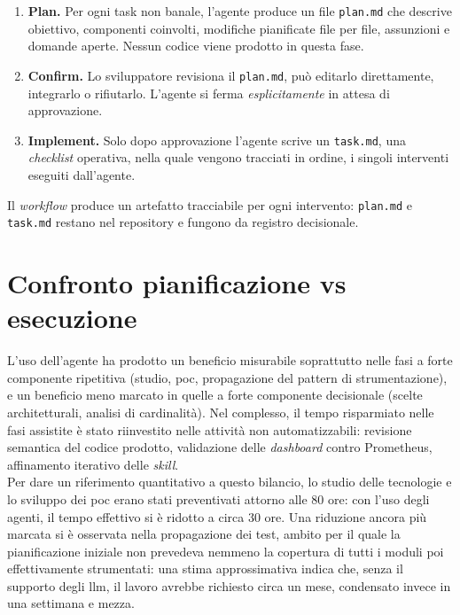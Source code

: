 \begin{enumerate}
      \item \textbf{Plan.} Per ogni task non banale, l'agente produce un file
            \texttt{plan.md} che descrive
            obiettivo, componenti coinvolti, modifiche pianificate file per file, assunzioni e
            domande aperte. Nessun codice viene prodotto in questa fase.
      \item \textbf{Confirm.} Lo sviluppatore revisiona il \texttt{plan.md}, può editarlo
            direttamente, integrarlo o rifiutarlo. L'agente si ferma \emph{esplicitamente} in
            attesa di approvazione.
      \item \textbf{Implement.} Solo dopo approvazione l'agente scrive un \texttt{task.md}, una
            \emph{checklist} operativa, nella quale vengono tracciati in ordine, i singoli interventi
            eseguiti dall'agente.
\end{enumerate}
Il \emph{workflow} produce un artefatto tracciabile per ogni intervento: \texttt{plan.md} e
\texttt{task.md} restano nel repository e fungono da registro decisionale.

\section{Confronto pianificazione vs esecuzione}

L'uso dell'agente ha prodotto un beneficio misurabile soprattutto nelle fasi a forte
componente ripetitiva (studio, \gls{poc}, propagazione del pattern di strumentazione), e un
beneficio meno marcato in quelle a forte componente decisionale (scelte architetturali,
analisi di cardinalità). Nel complesso, il tempo risparmiato nelle fasi assistite è stato
riinvestito nelle attività non automatizzabili: revisione semantica del codice prodotto,
validazione delle \emph{dashboard} contro Prometheus, affinamento iterativo delle
\emph{skill}.\\
Per dare un riferimento quantitativo a questo bilancio, lo studio delle tecnologie e lo
sviluppo dei \gls{poc} erano stati preventivati attorno alle 80 ore: con l'uso degli agenti,
il tempo effettivo si è ridotto a circa 30 ore. Una riduzione ancora più marcata si è
osservata nella propagazione dei test, ambito per il quale la pianificazione iniziale non
prevedeva nemmeno la copertura di tutti i moduli poi effettivamente strumentati: una
stima approssimativa indica che, senza il supporto degli \gls{llm}, il lavoro avrebbe
richiesto circa un mese, condensato invece in una settimana e mezza.

